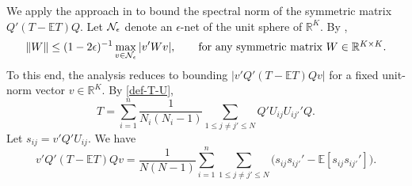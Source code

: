 \documentclass[preprint,11pt]{article}
\newcommand{\zy}[1]{{\color{red}\bf[ZY: #1]}}
\numberwithin{equation}{section}
\newcommand{\beq}{\begin{equation}}
\newcommand{\eeq}{\end{equation}}
\begin{document}
We apply the approach in \cite{vershynin2010introduction} to bound the spectral norm of the symmetric matrix $Q'(T-\mathbb{E}T)Q$. 
Let ${\cal N}_\epsilon$ denote an $\epsilon$-net of the unit sphere of $\mathbb{R}^K$.  By \cite[Lemma 5.4]{vershynin2010introduction}, %
\beq \label{error22-temp2}
\|W\|\leq (1-2\epsilon)^{-1}\max_{v\in{\cal N}_\epsilon}|v'Wv|, \qquad \mbox{for any symmetric matrix $W\in\mathbb{R}^{K\times K}$}. 
\eeq
To this end, the analysis reduces to bounding $|v'Q'(T-\mathbb{E}T)Qv|$ for a fixed unit-norm vector $v\in\mathbb{R}^K$.
By \eqref{def-T-U}, 
\[
T = \sum_{i=1}^n \frac{1}{N_i(N_i-1)} \sum_{1\leq j\neq j'\leq N} Q'U_{ij}U_{ij'}'Q.
\]
Let $s_{ij}=v'Q'U_{ij}$. 
We have
\beq \label{u-stat-T-ET}
v'Q'(T-\mathbb{E}T)Qv 
= \frac{1}{N(N-1)}\sum_{i=1}^n \sum_{1\leq j\neq j'\leq N}\bigl(s_{ij}s_{ij'}'  - \mathbb{E}[s_{ij}s_{ij'}']\bigr). 
\eeq
\end{document}
